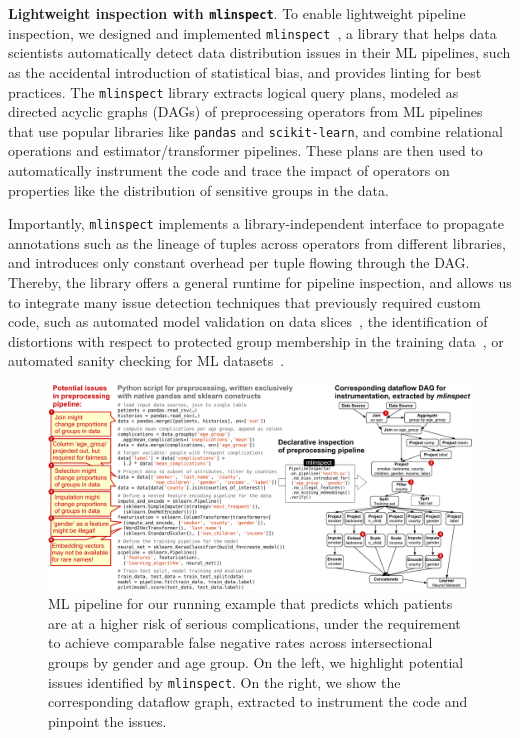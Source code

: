 \documentclass[11pt]{article}
\newcommand{\sklearn}{\stt{scikit-learn}\xspace}
\newcommand{\pandas}{\stt{pandas}\xspace}
\newcommand{\mlinspect}{\stt{mlinspect}\xspace}
\newcommand{\header}[1]{\vspace{1mm}\noindent\textbf{#1}.}
\newcommand{\stt}[1]{{\footnotesize\texttt{#1}}}
\begin{document}
\header{Lightweight inspection with \mlinspect} To enable lightweight pipeline inspection, we designed and implemented \mlinspect~\cite{grafberger2021mlinspect}, a library that helps data scientists automatically detect data distribution issues in their ML pipelines, such as the accidental introduction of statistical bias, and provides linting for best practices. The \mlinspect library extracts logical query plans, modeled as directed acyclic graphs (DAGs) of preprocessing operators from ML pipelines that use  popular libraries like \pandas and \sklearn, and combine relational operations and estimator/transformer pipelines. These plans are then used to automatically instrument the code and trace the impact of operators on properties like the distribution of sensitive groups in the data. 

Importantly, \mlinspect implements a library-independent interface to propagate annotations such as the lineage of tuples across operators from different libraries, and introduces only constant overhead per tuple flowing through the DAG. Thereby, the library offers a general runtime for pipeline inspection, and allows us to integrate many issue detection techniques that previously required custom code, such as automated model validation on data slices~\cite{SliceFinder}, the identification of distortions with respect to protected group membership in the training data~\cite{fairdags}, or automated sanity checking for ML datasets~\cite{hynes2017data}.

\begin{figure}[t!]
  \centering
  \includegraphics[width=\textwidth]{figs/example-crop.pdf}
  \caption{ML pipeline for our running example that predicts which patients are at a higher risk of serious complications, under the requirement to achieve comparable false negative rates across intersectional groups by gender and age group.  On the left, we highlight potential issues identified by \mlinspect. On the right, we show the corresponding dataflow graph, extracted to instrument the code and pinpoint the issues.}
  \label{fig:example}
\end{figure}
\end{document}
